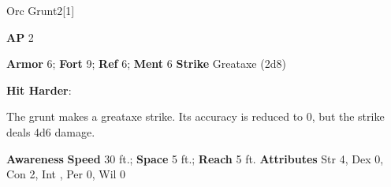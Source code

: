 \begin{monsection}{Orc Grunt}{2}[1]
\vspace{-1em}\vspace{-1em}
\begin{spellcontent}
\begin{spelltargetinginfo}
{\textbf{AP} 2}

\pari \textbf{Armor} 6;
\textbf{Fort} 9;
\textbf{Ref} 6;
\textbf{Ment} 6
\pari \textbf{Strike} Greataxe  (2d8)



\end{spelltargetinginfo}


\begin{spelleffects}

\pari
\textbf{Hit Harder}:

The grunt makes a greataxe strike.
Its accuracy is reduced to 0, but the strike deals 4d6 damage.




\end{spelleffects}

\end{spellcontent}

\begin{monsterfooter}
\pari \textbf{Awareness} 
\pari \textbf{Speed} 30 ft.;
\textbf{Space} 5 ft.;
\textbf{Reach} 5 ft.
\pari \textbf{Attributes}
Str 4,
Dex 0,
Con 2,
Int ,
Per 0,
Wil 0
\end{monsterfooter}
\end{monsection}



